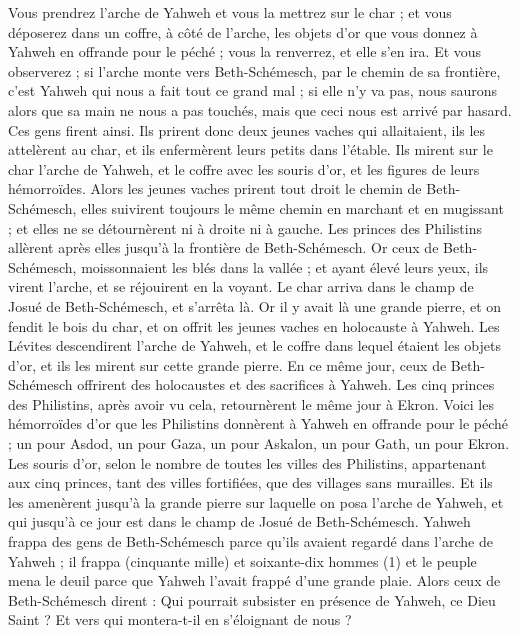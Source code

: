 \begin{multicols}{2}
Vous prendrez l'arche de Yahweh et vous la mettrez sur le char ; et vous déposerez dans un coffre, à côté de l’arche, les objets d'or que vous donnez à Yahweh en offrande pour le péché ; vous la renverrez, et elle s'en ira.
Et vous observerez ; si l'arche monte vers Beth-Schémesch, par le chemin de sa frontière, c'est Yahweh qui nous a fait tout ce grand mal ; si elle n'y va pas, nous saurons alors que sa main ne nous a pas touchés, mais que ceci nous est arrivé par hasard.
Ces gens firent ainsi. Ils prirent donc deux jeunes vaches qui allaitaient, ils les attelèrent au char, et ils enfermèrent leurs petits dans l'étable.
Ils mirent sur le char l'arche de Yahweh, et le coffre avec les souris d'or, et les figures de leurs hémorroïdes.
Alors les jeunes vaches prirent tout droit le chemin de Beth-Schémesch, elles suivirent toujours le même chemin en marchant et en mugissant ; et elles ne se détournèrent ni à droite ni à gauche. Les princes des Philistins allèrent après elles jusqu'à la frontière de Beth-Schémesch.
Or ceux de Beth-Schémesch, moissonnaient les blés dans la vallée ; et ayant élevé leurs yeux, ils virent l'arche, et se réjouirent en la voyant.
Le char arriva dans le champ de Josué de Beth-Schémesch, et s'arrêta là. Or il y avait là une grande pierre, et on fendit le bois du char, et on offrit les jeunes vaches en holocauste à Yahweh.
Les Lévites descendirent l'arche de Yahweh, et le coffre dans lequel étaient les objets d'or, et ils les mirent sur cette grande pierre. En ce même jour, ceux de Beth-Schémesch offrirent des holocaustes et des sacrifices à Yahweh.
Les cinq princes des Philistins, après avoir vu cela, retournèrent le même jour à Ekron.
Voici les hémorroïdes d'or que les Philistins donnèrent à Yahweh en offrande pour le péché ; un pour Asdod, un pour Gaza, un pour Askalon, un pour Gath, un pour Ekron.
Les souris d’or, selon le nombre de toutes les villes des Philistins, appartenant aux cinq princes, tant des villes fortifiées, que des villages sans murailles. Et ils les amenèrent jusqu'à la grande pierre sur laquelle on posa l'arche de Yahweh, et qui jusqu'à ce jour est dans le champ de Josué de Beth-Schémesch.
Yahweh frappa des gens de Beth-Schémesch parce qu'ils avaient regardé dans l'arche de Yahweh ; il frappa (cinquante mille) et soixante-dix hommes (1) et le peuple mena le deuil parce que Yahweh l'avait frappé d'une grande plaie.
Alors ceux de Beth-Schémesch dirent : Qui pourrait subsister en présence de Yahweh, ce Dieu Saint ? Et vers qui montera-t-il en s'éloignant de nous ?

\end{multicols}
